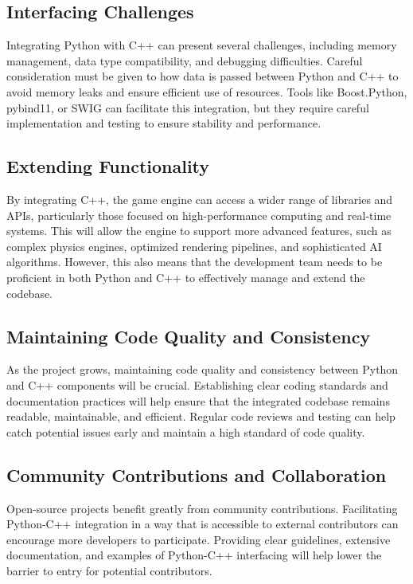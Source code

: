 \subsection*{Interfacing Challenges}

Integrating Python with C++ can present several challenges, including memory management, data type compatibility, and debugging difficulties. Careful consideration must be given to how data is passed between Python and C++ to avoid memory leaks and ensure efficient use of resources. Tools like Boost.Python, pybind11, or SWIG can facilitate this integration, but they require careful implementation and testing to ensure stability and performance.

\subsection*{Extending Functionality}

By integrating C++, the game engine can access a wider range of libraries and APIs, particularly those focused on high-performance computing and real-time systems. This will allow the engine to support more advanced features, such as complex physics engines, optimized rendering pipelines, and sophisticated AI algorithms. However, this also means that the development team needs to be proficient in both Python and C++ to effectively manage and extend the codebase.

\subsection*{Maintaining Code Quality and Consistency}

As the project grows, maintaining code quality and consistency between Python and C++ components will be crucial. Establishing clear coding standards and documentation practices will help ensure that the integrated codebase remains readable, maintainable, and efficient. Regular code reviews and testing can help catch potential issues early and maintain a high standard of code quality.

\subsection*{Community Contributions and Collaboration}

Open-source projects benefit greatly from community contributions. Facilitating Python-C++ integration in a way that is accessible to external contributors can encourage more developers to participate. Providing clear guidelines, extensive documentation, and examples of Python-C++ interfacing will help lower the barrier to entry for potential contributors.





